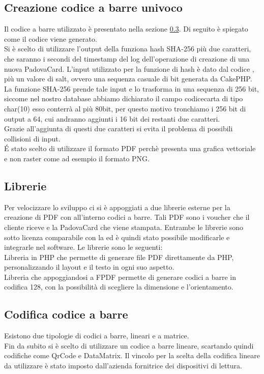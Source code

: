 \subsection{Creazione codice a barre univoco}
Il codice a barre utilizzato è presentato nella sezione \ref{codicebarre}. Di seguito è spiegato come il codice viene generato. \\

Si è scelto di utilizzare l'output della funziona hash SHA-256 più due caratteri, che saranno i secondi del timestamp del log dell'operazione di creazione di una nuova PadovaCard. 
L'input utilizzato per la funzione di hash è dato dal codice \tlite, più un valore di salt, ovvero una sequenza casuale di bit generata da CakePHP.\\

La funzione SHA-256 prende tale input e lo trasforma in una sequenza di 256 bit, siccome nel nostro database abbiamo dichiarato il campo codicecarta di tipo char(10) esso conterrà al più 80bit, per questo motivo tronchiamo i 256 bit di output a 64, cui andranno aggiunti i 16 bit dei restanti due caratteri.\\ 

Grazie all'aggiunta di questi due caratteri si evita il problema di possibili collisioni di input. \\

\'E stato scelto di utilizzare il formato PDF perchè presenta una grafica vettoriale e non raster come ad esempio il formato PNG.
\subsection{Librerie}\label{librerie}
Per velocizzare lo sviluppo ci si è appoggiati a due librerie esterne per la creazione di PDF con all'interno codici a barre.
Tali PDF sono i voucher che il cliente riceve e la PadovaCard che viene stampata.
Entrambe le librerie sono sotto licenza comparabile con la  ed è quindi stato possibile modificarle e integrarle nel software.
Le librerie sono le seguenti:\\
Libreria in PHP che permette di generare file PDF direttamente da PHP, personalizzando il layout e il testo in ogni suo aspetto.\\
Libreria che appoggiandosi a FPDF permette di generare codici a barre in codifica 128, con la possibilità di scegliere la dimensione e l'orientamento.

\subsection{Codifica codice a barre}
\label{codicebarre}
Esistono due tipologie di codici a barre, lineari e a matrice. \\
Fin da subito si è scelto di utilizzare un codice a barre lineare, scartando quindi codifiche come QrCode e DataMatrix.
Il vincolo per la scelta della codifica lineare da utilizzare è stato imposto dall'azienda fornitrice dei dispositivi di lettura.\\ 

